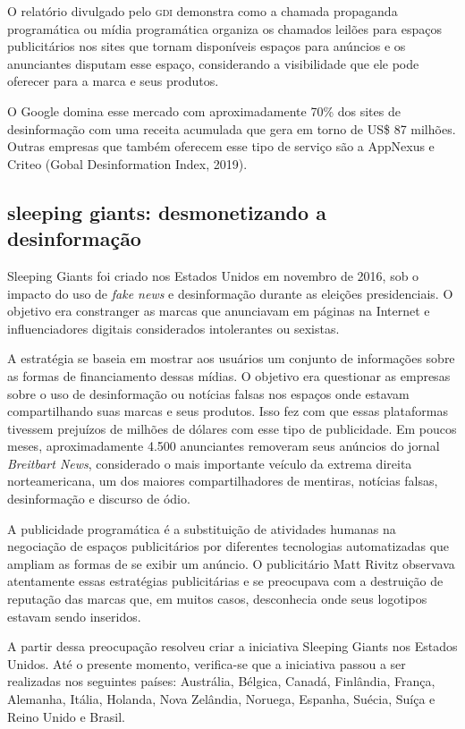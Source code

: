 O relatório divulgado pelo \textsc{gdi} demonstra como a chamada propaganda
programática ou mídia programática organiza os chamados leilões para
espaços publicitários nos sites que tornam disponíveis espaços para
anúncios e os anunciantes disputam esse espaço, considerando a
visibilidade que ele pode oferecer para a marca e seus produtos.

O Google domina esse mercado com aproximadamente 70\% dos sites de
desinformação com uma receita acumulada que gera em torno de US\$ 87
milhões. Outras empresas que também oferecem esse tipo de serviço são a
AppNexus e Criteo (Gobal Desinformation Index, 2019).

\subsection{sleeping giants: desmonetizando a desinformação}

Sleeping Giants foi criado nos Estados Unidos em novembro de 2016, sob o
impacto do uso de \textit{fake news} e desinformação durante as eleições
presidenciais. O objetivo era constranger as marcas que anunciavam em
páginas na Internet e influenciadores digitais considerados intolerantes
ou sexistas.

A estratégia se baseia em mostrar aos usuários um conjunto de
informações sobre as formas de financiamento dessas mídias. O objetivo
era questionar as empresas sobre o uso de desinformação ou notícias
falsas nos espaços onde estavam compartilhando suas marcas e seus
produtos. Isso fez com que essas plataformas tivessem prejuízos de
milhões de dólares com esse tipo de publicidade. Em poucos meses,
aproximadamente 4.500 anunciantes removeram seus anúncios do jornal
\textit{Breitbart News}, considerado o mais importante veículo da extrema
direita norteamericana, um dos maiores compartilhadores de mentiras,
notícias falsas, desinformação e discurso de ódio.

A publicidade programática é a substituição de atividades humanas na
negociação de espaços publicitários por diferentes tecnologias
automatizadas que ampliam as formas de se exibir um anúncio. O
publicitário Matt Rivitz observava atentamente essas estratégias
publicitárias e se preocupava com a destruição de reputação das marcas
que, em muitos casos, desconhecia onde seus logotipos estavam sendo
inseridos.

A partir dessa preocupação resolveu criar a iniciativa Sleeping Giants
nos Estados Unidos. Até o presente momento, verifica-se que a iniciativa
passou a ser realizadas nos seguintes países: Austrália, Bélgica,
Canadá, Finlândia, França, Alemanha, Itália, Holanda, Nova Zelândia,
Noruega, Espanha, Suécia, Suíça e Reino Unido e Brasil.

